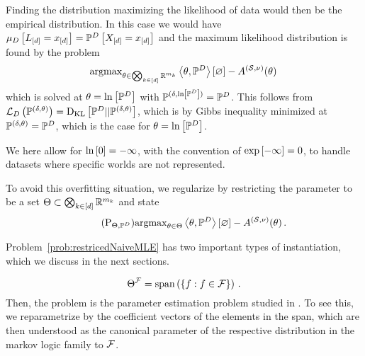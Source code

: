 Finding the distribution maximizing the likelihood of data would then be the empirical distribution.
In this case we would have $\mu_{D}\left[L_{[d]}=x_{[d]}\right] = \mathbb{P}^{D}\left[X_{[d]}=x_{[d]}\right]$ and the maximum likelihood distribution is found by the problem
\begin{align*}
	\mathrm{argmax}_{\theta\in\bigotimes_{k\in[d]} \mathbb{R}^{m_{k}}}  \left\langle \theta,\mathbb{P}^{D}\right\rangle \left[ \varnothing \right] - A^{(\mathcal{S},\nu)}(\theta) \,
\end{align*}
which is solved at $\theta=\ln \left[ \mathbb{P}^{D} \right]$ with $\mathbb{P}^{(\delta,\ln \left[ \mathbb{P}^{D} \right])}= \mathbb{P}^{D}$.
This follows from $\mathcal{L}_{D}\left(\mathbb{P}^{(\delta,\theta)}\right)=\mathrm{D}_{\mathrm{KL}}\left[ \mathbb{P}^{D} || \mathbb{P}^{(\delta,\theta)} \right]$, which is by Gibbs inequality minimized at $\mathbb{P}^{(\delta,\theta)}=\mathbb{P}^{D}$, which is the case for $\theta = \ln \left[ \mathbb{P}^{D} \right]$.

We here allow for $\ln \left[ 0 \right]=-\infty$, with the convention of $\mathrm{exp}\left[-\infty\right]=0$, to handle datasets where specific worlds are not represented.


To avoid this overfitting situation, we regularize by restricting the parameter to be a set $\Theta\subset\bigotimes_{k\in[d]} \mathbb{R}^{m_{k}}$ and state
\begin{align}\tag{$\mathrm{P}_{\energyhypothesis, \empdistribution}$}\label{prob:restrictedNaiveMLE}
	\argmax_{\canparam\in\energyhypothesis}  \sbcontraction{\canparam,\empdistribution} - \cumfunctionof{\canparam} \, .
\end{align}

Problem~\ref{prob:restricedNaiveMLE} has two important types of instantiation, which we discuss in the next sections.


	\[ \Theta^{\mathcal{F}} = \mathrm{span}\left(\{f : f\in\mathcal{F} \}\right) \, . \]
Then, the problem is the parameter estimation problem studied in .
To see this, we reparametrize by the coefficient vectors of the elements in the span, which are then understood as the canonical parameter of the respective distribution in the markov logic family to $\mathcal{F}$.


